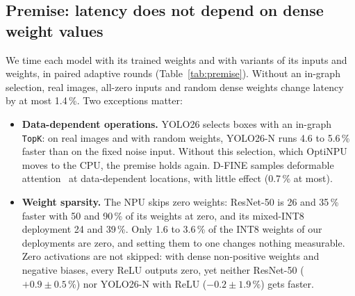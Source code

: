 \documentclass[conference]{IEEEtran}
\newcommand{\tool}{OptiNPU}
\begin{document}
\subsection{Premise: latency does not depend on dense weight values}
\label{sec:premise}

We time each model with its trained weights and with variants of its inputs and weights, in paired adaptive rounds (Table~\ref{tab:premise}). Without an in-graph selection, real images, all-zero inputs and random dense weights change latency by at most 1.4\,\%. Two exceptions matter:
\begin{itemize}
\item \textbf{Data-dependent operations.} YOLO26 selects boxes with an in-graph \texttt{TopK}: on real images and with random weights, YOLO26-N runs 4.6 to 5.6\,\% faster than on the fixed noise input. Without this selection, which \tool{} moves to the CPU, the premise holds again. D-FINE samples deformable attention~\cite{zhu2021deformable} at data-dependent locations, with little effect (0.7\,\% at most).
\item \textbf{Weight sparsity.} The NPU skips zero weights: ResNet-50 is 26 and 35\,\% faster with 50 and 90\,\% of its weights at zero, and its mixed-INT8 deployment 24 and 39\,\%. Only 1.6 to 3.6\,\% of the INT8 weights of our deployments are zero, and setting them to one changes nothing measurable. Zero activations are not skipped: with dense non-positive weights and negative biases, every ReLU outputs zero, yet neither ResNet-50 ($+0.9 \pm 0.5\,\%$) nor YOLO26-N with ReLU ($-0.2 \pm 1.9\,\%$) gets faster.
\end{itemize}
\end{document}
